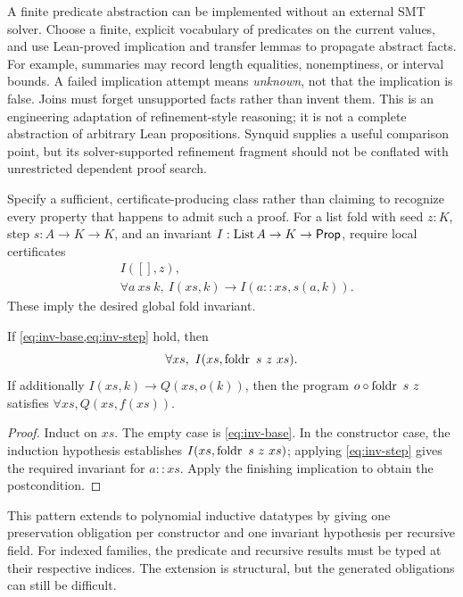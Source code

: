 A finite predicate abstraction can be implemented without an external SMT solver. Choose a finite, explicit vocabulary of predicates on the current values, and use Lean-proved implication and transfer lemmas to propagate abstract facts. For example, summaries may record length equalities, nonemptiness, or interval bounds. A failed implication attempt means \emph{unknown}, not that the implication is false. Joins must forget unsupported facts rather than invent them. This is an engineering adaptation of refinement-style reasoning; it is not a complete abstraction of arbitrary Lean propositions. Synquid supplies a useful comparison point, but its solver-supported refinement fragment should not be conflated with unrestricted dependent proof search.\cite{synquid}


\answer Specify a sufficient, certificate-producing class rather than claiming to recognize every property that happens to admit such a proof. For a list fold with seed $z:K$, step $s:A\to K\to K$, and an invariant $I:\operatorname{List} A\to K\to\mathsf{Prop}$, require local certificates
\begin{align}
 &I([],z),\label{eq:inv-base}\\
 &\forall a\ xs\ k,\ I(xs,k)\to I(a::xs,s(a,k)).\label{eq:inv-step}
\end{align}
These imply the desired global fold invariant.

\begin{proposition}
If \cref{eq:inv-base,eq:inv-step} hold, then
\[
 \forall xs,\ I(xs,\fold\ s\ z\ xs).
\]
If additionally $I(xs,k)\to Q(xs,o(k))$, then the program $o\circ\operatorname{foldr}\ s\ z$ satisfies $\forall xs, Q(xs,f(xs))$.
\end{proposition}
\begin{proof}
Induct on $xs$. The empty case is \cref{eq:inv-base}. In the constructor case, the induction hypothesis establishes $I(xs,\operatorname{foldr}\ s\ z\ xs)$; applying \cref{eq:inv-step} gives the required invariant for $a::xs$. Apply the finishing implication to obtain the postcondition.
\end{proof}

This pattern extends to polynomial inductive datatypes by giving one preservation obligation per constructor and one invariant hypothesis per recursive field. For indexed families, the predicate and recursive results must be typed at their respective indices. The extension is structural, but the generated obligations can still be difficult.

